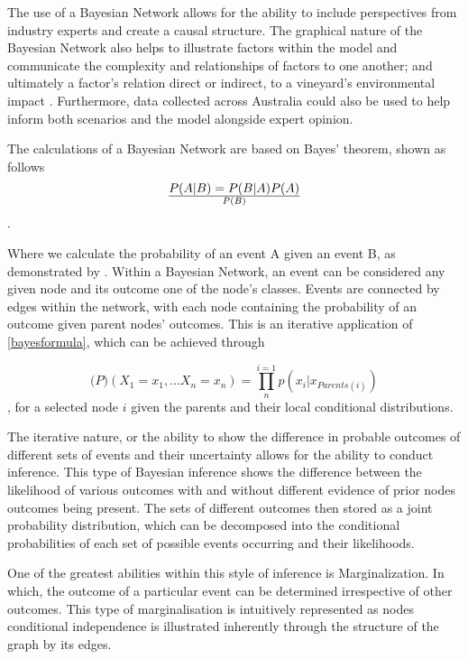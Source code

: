 The use of a Bayesian Network allows for the ability to include perspectives from industry experts and create a causal structure. The graphical nature of the Bayesian Network also helps to illustrate factors within the model and communicate the complexity and relationships of factors to one another; and ultimately a factor's relation direct or indirect, to a vineyard's environmental impact \citep{pourretBayesianNetworksPractical2008}. Furthermore, data collected across Australia could also be used to help inform both scenarios and the model alongside expert opinion.

The calculations of a Bayesian Network are based on Bayes' theorem, shown as follows
\begin{equation}\label{bayesformula}
P(A|B)= {P(B|A)P(A)}\over{P(B)}
\end{equation}.

Where we calculate the probability of an event A given an event B, as demonstrated by \cite{bayesLIIEssaySolving1763}. Within a Bayesian Network, an event can be considered any given node and its outcome one of the node's classes. Events are connected by edges within the network, with each node containing the probability of an outcome given parent nodes' outcomes. This is an iterative application of \ref{bayesformula}, which can be achieved through

\begin{equation}
        \mathbb(P) (X_{1}=x_{1},...X_{n}=x_{n})=\prod_{n}^{i=1}p(x_{i}|x_{Parents(i)})
\end{equation},
for a selected node $i$ given the parents and their local conditional distributions.

The iterative nature, or the ability to show the difference in probable outcomes of different sets of events and their uncertainty allows for the ability to conduct inference. This type of Bayesian inference shows the difference between the likelihood of various outcomes with and without different evidence of prior nodes outcomes being present. The sets of different outcomes then stored as a joint probability distribution, which can be decomposed into the conditional probabilities of each set of possible events occurring and their likelihoods.

One of the greatest abilities within this style of inference is Marginalization. In which, the outcome of a particular event can be determined irrespective of other outcomes. This type of marginalisation is intuitively represented as nodes conditional independence is illustrated inherently through the structure of the graph by its edges.

